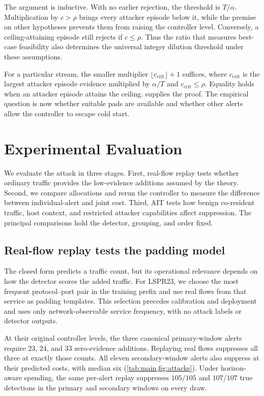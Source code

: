\documentclass[conference]{IEEEtran}
\begin{document}
The argument is inductive. With no earlier rejection, the threshold is $T/\alpha$.
Multiplication by $c>\rho$ brings every attacker episode below it, while the premise on other
hypotheses prevents them from raising the controller level. Conversely, a ceiling-attaining
episode still rejects if $c\le\rho$. Thus the ratio that measures best-case feasibility also
determines the universal integer dilution threshold under these assumptions.

For a particular stream, the smaller multiplier $\lfloor c_{\mathrm{crit}}\rfloor+1$ suffices,
where $c_{\mathrm{crit}}$ is the largest attacker episode evidence multiplied by $\alpha/T$ and
$c_{\mathrm{crit}}\le\rho$. Equality holds when an attacker episode attains the ceiling.
 supplies the proof. The empirical question is now whether suitable pads are
available and whether other alerts allow the controller to escape cold start.

\section{Experimental Evaluation}\label{sec:evaluation}

We evaluate the attack in three stages. First, real-flow replay tests whether ordinary traffic
provides the low-evidence additions assumed by the theory. Second, we compare allocations and rerun
the controller to measure the difference between individual-alert and joint cost. Third, AIT tests
how benign co-resident traffic, host context, and restricted attacker capabilities affect suppression.
The principal comparisons hold the detector, grouping, and order fixed.

\subsection{Real-flow replay tests the padding model}\label{sec:replay}

The closed form predicts a traffic count, but its operational relevance depends on how the detector
scores the added traffic. For LSPR23, we choose the most frequent protocol--port pair in the training
prefix and use real flows from that service as padding templates. This selection precedes
calibration and deployment and uses only network-observable service frequency, with no attack
labels or detector outputs.

At their original controller levels, the three canonical primary-window alerts require 23, 24,
and 33 zero-evidence additions. Replaying real flows suppresses all three at exactly those counts.
All eleven secondary-window alerts also suppress at their predicted costs, with median six
(\cref{tab:main,fig:attacks}). Under horizon-aware spending, the same per-alert replay suppresses
$105/105$ and $107/107$ true detections in the primary and secondary windows on every draw.
\end{document}
